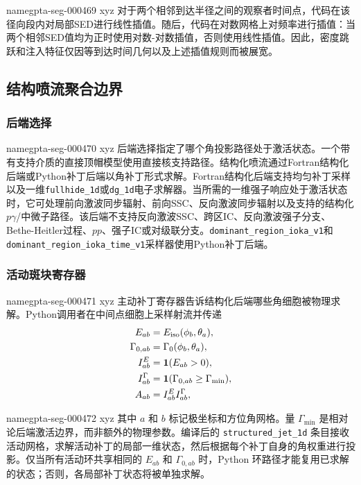 \documentclass[twocolumn]{aastex702}
\makeatletter
\providecommand{\gptareaderanchor}[1]{\pdfdest name{#1} xyz}%
\providecommand{\gptareaderanchor}[1]{\special{pdf:dest (#1) [ @thispage /XYZ @xpos @ypos null ]}}%
\makeatother
\begin{document}
\gptareaderanchor{gpta-seg-000469}%
对于两个相邻到达半径之间的观察者时间点，代码在该径向段内对局部SED进行线性插值。随后，代码在对数网格上对频率进行插值：当两个相邻SED值均为正时使用对数-对数插值，否则使用线性插值。因此，密度跳跃和注入特征仅因等到达时间几何以及上述插值规则而被展宽。

\subsection{结构喷流聚合边界}

\subsubsection{后端选择}


\gptareaderanchor{gpta-seg-000470}%
后端选择指定了哪个角投影路径处于激活状态。一个带有支持介质的直接顶帽模型使用直接核支持路径。结构化喷流通过Fortran结构化后端或Python补丁后端以角补丁形式求解。Fortran结构化后端支持均匀补丁采样以及一维\texttt{fullhide\_1d}或\texttt{dg\_1d}电子求解器。当所需的一维强子响应处于激活状态时，它可处理前向激波同步辐射、前向SSC、反向激波同步辐射以及支持的结构化\(p\gamma\)/中微子路径。该后端不支持反向激波SSC、跨区IC、反向激波强子分支、Bethe-Heitler过程、\(pp\)、强子IC或对级联分支。\texttt{dominant\_region\_ioka\_v1}和\texttt{dominant\_region\_ioka\_time\_v1}采样器使用Python补丁后端。

\subsubsection{活动斑块寄存器}


\gptareaderanchor{gpta-seg-000471}%
主动补丁寄存器告诉结构化后端哪些角细胞被物理求解。Python调用者在中间点细胞上采样射流并传递
\begin{equation}
\begin{aligned}
E_{ab}&=E_{\rm iso}(\phi_b,\theta_a),\\
\Gamma_{0,ab}&=\Gamma_0(\phi_b,\theta_a),\\
I^E_{ab}&=\mathbf{1}(E_{ab}>0),\\
I^\Gamma_{ab}&=\mathbf{1}(\Gamma_{0,ab}\ge\Gamma_{\min}),\\
A_{ab}&=I^E_{ab}I^\Gamma_{ab},
\end{aligned}
\end{equation}

\gptareaderanchor{gpta-seg-000472}%
其中 \(a\) 和 \(b\) 标记极坐标和方位角网格。量 \(\Gamma_{\min}\) 是相对论后端激活边界，而非额外的物理参数。编译后的 \texttt{structured\_jet\_1d} 条目接收活动网格，求解活动补丁的局部一维状态，然后根据每个补丁自身的角权重进行投影。仅当所有活动环共享相同的 \(E_{ab}\) 和 \(\Gamma_{0,ab}\) 时，Python 环路径才能复用已求解的状态；否则，各局部补丁状态将被单独求解。
\end{document}
